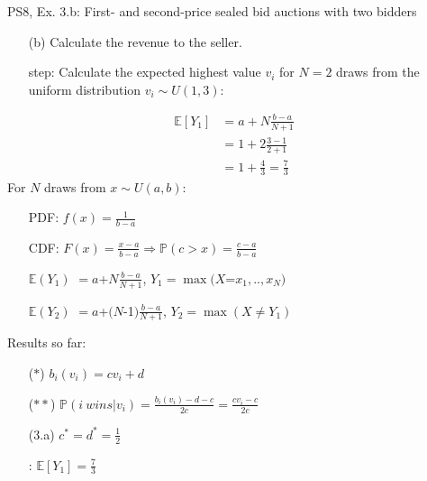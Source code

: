 \begin{frame}{PS8, Ex. 3.b: First- and second-price sealed bid auctions with two bidders}
    \begin{multicols}{2}
      \begin{itemize}
        \item[(b)] Calculate the revenue to the seller.
        \item[\nth{1} step:] Calculate the expected highest value $v_i$ for $N=2$ draws from the uniform distribution $v_i\sim U(1,3)$:
      \end{itemize}
      \vspace{-8pt}
      \begin{align*}
        \mathbb{E}[Y_1]&=a+N\frac{b-a}{N+1}\\
                       &=1+2\frac{3-1}{2+1}\\
                       &=1+\frac{4}{3}=\frac{7}{3}
      \end{align*}
      \vfill\null\columnbreak
      For $N$ draws from $x\sim U(a, b):$
      \vspace{-6pt}
      \begin{enumerate}
        \item[PDF:] $f(x)=\frac{1}{b-a}$
        \item[CDF:] $F(x)=\frac{x-a}{b-a}\Rightarrow\mathbb{P}(c>x)=\frac{c-a}{b-a}$
        \item[$\mathbb{E}(Y_1)$] $=a$+$N\frac{b-a}{N+1}$, $Y_1=\max(X$=$x_1,..,x_N)$
        \item[$\mathbb{E}(Y_2)$] $=a$+$(N$-1$)\frac{b-a}{N+1}$, $Y_2=\max(X\neq Y_1)$
      \end{enumerate}
      \vspace{-6pt}
      Results so far:
      \vspace{-6pt}
      \begin{itemize}
        \item[($*$)]  $b_i(v_i) = cv_i+d$
        \item[($**$)] $\mathbb{P}(i\ wins|v_i)=\frac{b_i(v_i)-d-c}{2c}=\frac{cv_i-c}{2c}$
        \item[(3.a)]    $c^*=d^*=\frac{1}{2}$
        \item[\nth{1}:] $\mathbb{E}[Y_1]=\frac{7}{3}$
      \end{itemize}
      \vfill\null
    \end{multicols}
\end{frame}
